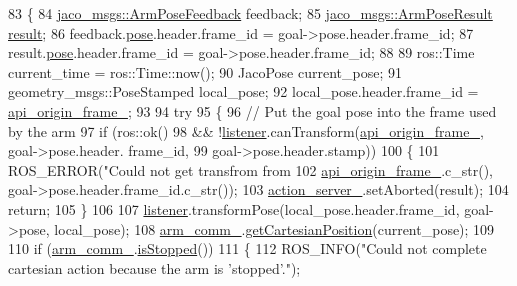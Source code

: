 \begin{DoxyCode}
83 \{
84     \hyperlink{structjaco__msgs_1_1ArmPoseFeedback__}{jaco\_msgs::ArmPoseFeedback} feedback;
85     \hyperlink{structjaco__msgs_1_1ArmPoseResult__}{jaco\_msgs::ArmPoseResult} \hyperlink{Kinova_8API_8CommLayerUbuntu_8h_a900dac90961bada00f57c207562a6a9a}{result};
86     feedback.\hyperlink{structjaco__msgs_1_1ArmPoseFeedback___a4a015f6a23c7830eff5fcb0036c1d98a}{pose}.header.frame\_id = goal->pose.header.frame\_id;
87     result.\hyperlink{structjaco__msgs_1_1ArmPoseResult___a35fabbce17a2d3c3c0e9bcd97985053b}{pose}.header.frame\_id = goal->pose.header.frame\_id;
88 
89     ros::Time current\_time = ros::Time::now();
90     JacoPose current\_pose;
91     geometry\_msgs::PoseStamped local\_pose;
92     local\_pose.header.frame\_id = \hyperlink{classjaco_1_1JacoPoseActionServer_a5f90297e166e0113362ad14abc78f13f}{api\_origin\_frame\_};
93 
94     \textcolor{keywordflow}{try}
95     \{
96         \textcolor{comment}{// Put the goal pose into the frame used by the arm}
97         \textcolor{keywordflow}{if} (ros::ok()
98                 && !\hyperlink{classjaco_1_1JacoPoseActionServer_a43c58cdc664caaa1471792c672aea7c1}{listener}.canTransform(\hyperlink{classjaco_1_1JacoPoseActionServer_a5f90297e166e0113362ad14abc78f13f}{api\_origin\_frame\_}, goal->pose.header.
      frame\_id,
99                                           goal->pose.header.stamp))
100         \{
101             ROS\_ERROR(\textcolor{stringliteral}{"Could not get transfrom from %
102                       \hyperlink{classjaco_1_1JacoPoseActionServer_a5f90297e166e0113362ad14abc78f13f}{api\_origin\_frame\_}.c\_str(), goal->pose.header.frame\_id.c\_str());
103             \hyperlink{classjaco_1_1JacoPoseActionServer_ac5ecd6a61bf824052ff744aad8bf886a}{action\_server\_}.setAborted(result);
104             \textcolor{keywordflow}{return};
105         \}
106 
107         \hyperlink{classjaco_1_1JacoPoseActionServer_a43c58cdc664caaa1471792c672aea7c1}{listener}.transformPose(local\_pose.header.frame\_id, goal->pose, local\_pose);
108         \hyperlink{classjaco_1_1JacoPoseActionServer_ad849b8d5a2bb31a65ab24b586a86c9a1}{arm\_comm\_}.\hyperlink{classjaco_1_1JacoComm_a855bbefed2093d0d0cc7763eb7306a0b}{getCartesianPosition}(current\_pose);
109 
110         \textcolor{keywordflow}{if} (\hyperlink{classjaco_1_1JacoPoseActionServer_ad849b8d5a2bb31a65ab24b586a86c9a1}{arm\_comm\_}.\hyperlink{classjaco_1_1JacoComm_a872b8033cda5a9fe4ccdca2e89aa03d1}{isStopped}())
111         \{
112             ROS\_INFO(\textcolor{stringliteral}{"Could not complete cartesian action because the arm is 'stopped'."});
}
\end{DoxyCode}
